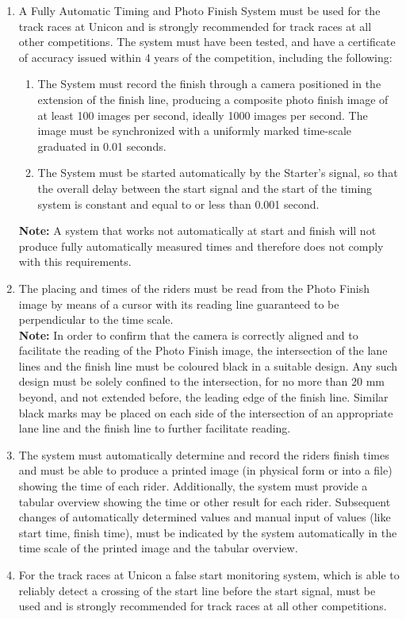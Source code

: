 \begin{enumerate}[leftmargin=1.5em,labelsep=*]
	\item A Fully Automatic Timing and Photo Finish System must be used for the track races at Unicon and is 
  strongly recommended for track races at all other competitions.
	The system must have been tested, and have a certificate of accuracy issued within 4 years of the competition, 
  including the following:
	
	\begin{enumerate}[label*=\arabic*,leftmargin=1.5em,labelsep=*]
		\item The System must record the finish through a camera positioned in the extension of the finish line, 
    producing a composite photo finish image of at least 100 images per second, ideally 1000 images per second. 
    The image must be synchronized with a uniformly marked time-scale graduated in 0.01 seconds.
		
		\item The System must be started automatically by the Starter's signal, so that the overall 
    delay between the start signal and the start of the timing system is constant and equal to or 
    less than 0.001 second.
	\end{enumerate}
	\textbf{Note:} A system that works not automatically at start and finish will not produce fully 
  automatically measured times and therefore does not comply with this requirements.
	
	\item The placing and times of the riders must be read from the Photo Finish image by means 
  of a cursor with its reading line guaranteed to be perpendicular to the time scale.\\	
	\textbf{Note:} In order to confirm that the camera is correctly aligned and to facilitate the reading of 
  the Photo Finish image, the intersection of the lane lines and the finish line must be coloured black in a 
  suitable design. Any such design must be solely confined to the intersection, for no more than 20 mm beyond, 
  and not extended before, the leading edge of the finish line. Similar black marks may be placed on each side of 
  the intersection of an appropriate lane line and the finish line to further facilitate reading.
	
	\item The system must automatically determine and record the riders finish times and must be able to produce 
  a printed image (in physical form or into a file) showing the time of each rider. 
  Additionally, the system must provide a tabular overview showing the time or other result for each rider. 
  Subsequent changes of automatically determined values and manual input of values (like start time, finish time), 
  must be indicated by the system automatically in the time scale of the printed image and the tabular overview.
	
	\item For the track races at Unicon a false start monitoring system, which is able to reliably detect a 
  crossing of the start line before the start signal, must be used and is strongly recommended for track races 
  at all other competitions.
\end{enumerate}

